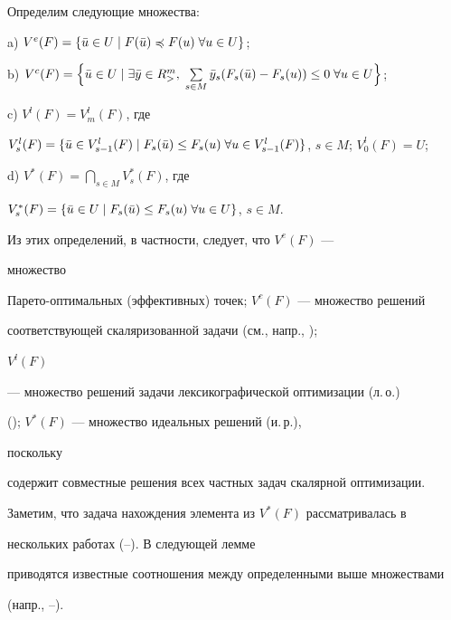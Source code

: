 Определим следующие множества:





a) $V^e(F)=\{\Bar u\in U\mid F(\Bar u)\preccurlyeq F(u)\;\forall u\in U\}$;





b) $V^c(F)=\Bigl\{\Bar u\in U\mid\exists\Bar y\in R^m_{>},\;


\sum\limits_{s\in M}\Bar y_s(F_s(\Bar u)-F_s(u))\le 0\;


\forall u\in U\Bigr\}$;





c) $V^l(F)=V^l_m(F)$, где


$V^l_s(F)=\{\Bar u\in V^l_{s-1}(F)\mid F_s(\Bar u)\le F_s(u)\;


\forall u\in V^l_{s-1}(F)\}$, $s\in M$; $V^l_0(F)=U$;





d) $V^*(F)=\bigcap\limits_{s\in M}V^*_s(F)$, где


$V^*_s(F)=\{\Bar u\in U\mid F_s(\Bar u)\le F_s(u)\;


\forall u\in U\}$, $s\in  M$.





\noindent Из этих определений, в частности, следует, что $V^e(F)$ --- 


множество


Парето-оптимальных (эффективных) точек; $V^c(F)$ --- множество решений


соответствующей скаляризованной задачи (см., напр., \cite{Pod2});


$V^l(F)$


--- множество решений задачи лексикографической оптимизации (л.\,о.)


(\cite{Pod1}); $V^*(F)$ --- множество идеальных решений (и.\,р.),


поскольку


содержит совместные решения всех частных задач скалярной оптимизации.


Заметим, что задача нахождения элемента из $V^*(F)$ рассматривалась в


нескольких работах (\cite{Yud}--\cite{Gia}). В следующей лемме


приводятся известные соотношения между определенными выше множествами


(напр., \cite{Pod1}--\cite{Saw}).






